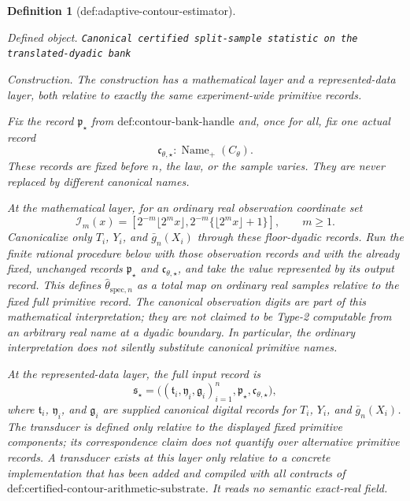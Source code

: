 \documentclass{article}
\newtheorem{definition}{Definition}
\begin{document}
\begin{definition}[def:adaptive-contour-estimator]\label{def:adaptive-contour-estimator}
\par\smallskip\noindent\emph{Defined object.} \texttt{Canonical certified split-\allowbreak{}sample statistic on the translated-\allowbreak{}dyadic bank}
\par\smallskip\noindent\emph{Construction.} The construction has a mathematical layer and a represented-data layer, both relative to exactly the same experiment-wide primitive records.

Fix the record \(\mathfrak p_{\star}\) from \(\text{def:contour-bank-handle}\) and, once for all, fix one actual record
\[
 \mathfrak c_{\theta,\star}:\operatorname{Name}_{+}(C_{\theta}).
\]
These records are fixed before \(n\), the law, or the sample varies.  They are never replaced by different canonical names.

At the mathematical layer, for an ordinary real observation coordinate set
\[
 \mathcal I_m(x)=
 \left[2^{-m}\lfloor2^m x\rfloor,
       2^{-m}\{\lfloor2^m x\rfloor+1\}\right],
 \qquad m\ge1.
\]
Canonicalize only \(T_i\), \(Y_i\), and \(\bar g_n(X_i)\) through these floor-dyadic records.  Run the finite rational procedure below with those observation records and with the already fixed, unchanged records \(\mathfrak p_{\star}\) and \(\mathfrak c_{\theta,\star}\), and take the value represented by its output record.  This defines \(\widehat\theta_{\mathrm{spec},n}\) as a total map on ordinary real samples relative to the fixed full primitive record.  The canonical observation digits are part of this mathematical interpretation; they are not claimed to be Type-2 computable from an arbitrary real name at a dyadic boundary.  In particular, the ordinary interpretation does not silently substitute canonical primitive names.

At the represented-data layer, the full input record is
\[
 \mathfrak s_{\star}=
 \bigl((\mathfrak t_i,\mathfrak y_i,\mathfrak g_i)_{i=1}^n,
       \mathfrak p_{\star},\mathfrak c_{\theta,\star}\bigr),
\]
where \(\mathfrak t_i\), \(\mathfrak y_i\), and \(\mathfrak g_i\) are supplied canonical digital records for \(T_i\), \(Y_i\), and \(\bar g_n(X_i)\).  The transducer is defined only relative to the displayed fixed primitive components; its correspondence claim does not quantify over alternative primitive records.  A transducer exists at this layer only relative to a concrete implementation that has been added and compiled with all contracts of \(\text{def:certified-contour-arithmetic-substrate}\).  It reads no semantic exact-real field.


\end{definition}
\end{document}
